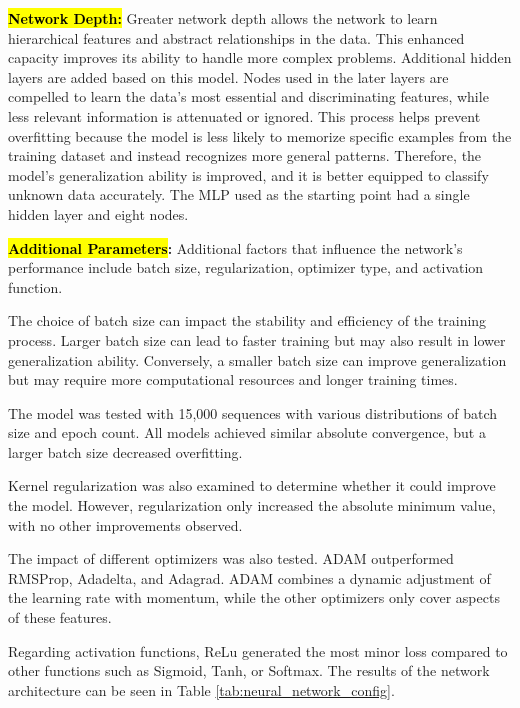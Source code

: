 \documentclass[energies,article,accept,pdftex,moreauthors]{Definitions/mdpi}
\begin{document}
\textbf{\hl{Network Depth:}} Greater network depth allows the network to learn hierarchical features and abstract relationships in the data. This enhanced capacity improves its ability to handle more complex problems. Additional hidden layers are added based on this model. Nodes used in the later layers are compelled to learn the data's most essential and discriminating features, while less relevant information is attenuated or ignored. This process helps prevent overfitting because the model is less likely to memorize specific examples from the training dataset and instead recognizes more general patterns. Therefore, the model's generalization ability is improved, and it is better equipped to classify unknown data accurately. The MLP used as the starting point had a single hidden layer and eight nodes.

\textbf{\hl{Additional Parameters}:} Additional factors that influence the network's performance include batch size, regularization, optimizer type, and activation function.

The choice of batch size can impact the stability and efficiency of the training process. Larger batch size can lead to faster training but may also result in lower generalization ability. Conversely, a smaller batch size can improve generalization but may require more computational resources and longer training times.

The model was tested with 15,000 sequences with various distributions of batch size and epoch count. All models achieved similar absolute convergence, but a larger batch size decreased overfitting.

Kernel regularization was also examined to determine whether it could improve the model. However, regularization only increased the absolute minimum value, with no other improvements observed.

The impact of different optimizers was also tested. ADAM outperformed RMSProp, Adadelta, and Adagrad. ADAM combines a dynamic adjustment of the learning rate with momentum, while the other optimizers only cover aspects of these features.

Regarding activation functions, ReLu generated the most minor loss compared to other functions such as Sigmoid, Tanh, or Softmax. The results of the network architecture can be seen in Table \ref{tab:neural_network_config}.
\end{document}
